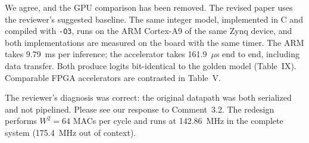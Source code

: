 \documentclass[10pt,a4paper]{article}
\begin{document}
We agree, and the GPU comparison has been removed. The revised paper uses the reviewer's
suggested baseline. The same integer model, implemented in C and compiled with \texttt{-O3},
runs on the ARM Cortex-A9 of the same Zynq device, and both implementations are measured on the
board with the same timer. The ARM takes 9.79~ms per inference; the accelerator takes
161.9~$\mu$s end to end, including data transfer. Both produce logits bit-identical to the golden
model (Table~IX). Comparable FPGA accelerators are contrasted in Table~V.

The reviewer's diagnosis was correct: the original datapath was both serialized and not
pipelined. Please see our response to Comment~3.2. The redesign performs $W^2{=}64$ MACs per
cycle and runs at 142.86~MHz in the complete system (175.4~MHz out of context).
\end{document}
